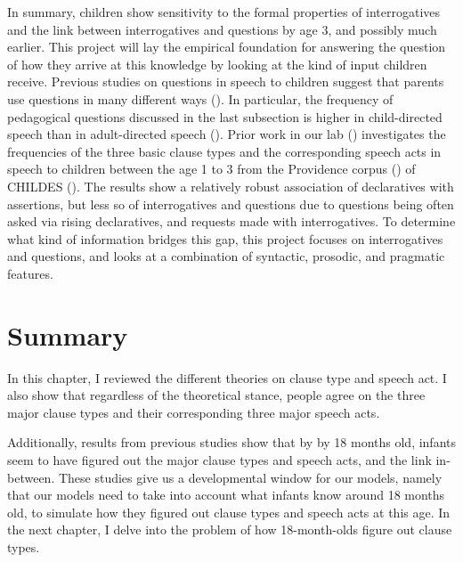 In summary, children show sensitivity to the formal properties of interrogatives and the link between interrogatives and questions by age 3, and possibly much earlier. This project will lay the empirical foundation for answering the question of how they arrive at this knowledge by looking at the kind of input children receive. Previous studies on questions in speech to children suggest that parents use questions in many different ways (\citealt{holzman1972, shatz1979, tamir1980, yu2019pedagogical}). In particular, the frequency of pedagogical questions discussed in the last subsection is higher in child-directed speech than in adult-directed speech (\citealt{stivers2010}). Prior work in our lab (\citealt{zaitsu2020}) investigates the frequencies of the three basic clause types and the corresponding speech acts in speech to children between the age 1 to 3 from the Providence corpus (\citealt{ProvidenceCorpus}) of CHILDES (\citealt{CHILDES}). The results show a relatively robust association of declaratives with assertions, but less so of interrogatives and questions due to questions being often asked via rising declaratives, and requests made with interrogatives. To determine what kind of information bridges this gap, this project focuses on interrogatives and questions, and looks at a combination of syntactic, prosodic, and pragmatic features.


\section{Summary}
In this chapter, I reviewed the different theories on clause type and speech act. I also show that regardless of the theoretical stance, people agree on the three major clause types and their corresponding three major speech acts. 

Additionally, results from previous studies show that by by 18 months old, infants seem to have figured out the major clause types and speech acts, and the link in-between. These studies give us a developmental window for our models, namely that our models need to take into account what infants know around 18 months old, to simulate how they figured out clause types and speech acts at this age. In the next chapter, I delve into the problem of how 18-month-olds figure out clause types.






